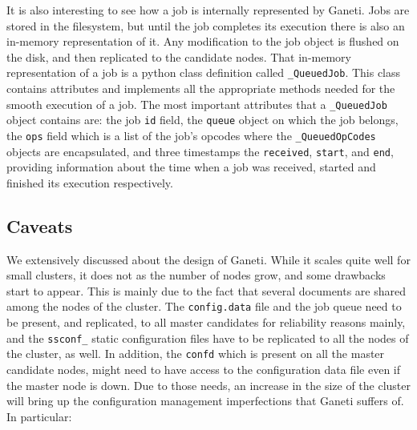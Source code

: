 It is also interesting to see how a job is internally represented by Ganeti.
Jobs are stored in the filesystem, but until the job completes its execution
there is also an in-memory representation of it. Any modification to the job
object is flushed on the disk, and then replicated to the candidate nodes. That
in-memory representation of a job is a python class definition called
\texttt{\_QueuedJob}. This class contains attributes and implements all the
appropriate methods needed for the smooth execution of a job. The most important
attributes that a \texttt{\_QueuedJob} object contains are: the job \texttt{id}
field, the \texttt{queue} object on which the job belongs, the \texttt{ops}
field which is a list of the job's opcodes where the \texttt{\_QueuedOpCodes}
objects are encapsulated, and three timestamps the \texttt{received},
\texttt{start}, and \texttt{end}, providing information about the time when a
job was received, started and finished its execution respectively.

\subsection{Caveats}\label{sec:caveats}

We extensively discussed about the design of Ganeti. While it scales quite well
for small clusters, it does not as the number of nodes grow, and some drawbacks
start to appear. This is mainly due to the fact that several documents are
shared among the nodes of the cluster. The \texttt{config.data} file and the job
queue need to be present, and replicated, to all master candidates for
reliability reasons mainly, and the \texttt{ssconf\_} static configuration
files have to be replicated to all the nodes of the cluster, as well. In
addition, the \texttt{confd} which is present on all the master candidate nodes,
might need to have access to the configuration data file even if the master node
is down. Due to those needs, an increase in the size of the cluster will bring
up the configuration management imperfections that Ganeti suffers of. In
particular:


